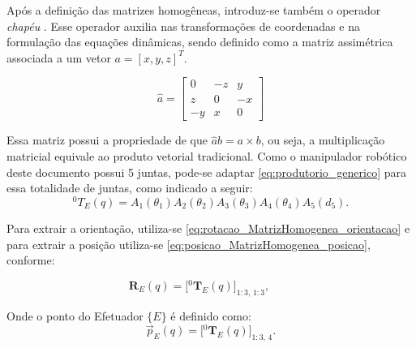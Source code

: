 Após a definição das matrizes homogêneas, introduz-se também o operador \emph{chapéu} \cite{murray1994mathematical}. Esse operador auxilia nas transformações de coordenadas e na formulação das equações dinâmicas, sendo definido como a matriz assimétrica associada a um vetor $a = [x, y, z]^T$.

\begin{equation}
    \label{eq:matriz_assimetrica}
    \hat{a} = 
    \begin{bmatrix}
        0   & -z  &  y \\
        z   &  0  & -x \\
        -y  &  x  &  0
    \end{bmatrix}
\end{equation}

Essa matriz possui a propriedade de que $\hat{a} b = a \times b$, ou seja, a multiplicação matricial equivale ao produto vetorial tradicional.
Como o manipulador robótico deste documento possui 5 juntas, pode-se adaptar \eqref{eq:produtorio_generico} para essa totalidade de juntas, como indicado a seguir:
\begin{equation}
{}^{0}\!T_E(q)=
A_1(\theta_1)
A_2(\theta_2)
A_3(\theta_3)
A_4(\theta_4)
A_5(d_5).
\end{equation}

Para extrair a orientação, utiliza-se \eqref{eq:rotacao_MatrizHomogenea_orientacao} e para extrair a posição utiliza-se \eqref{eq:posicao_MatrizHomogenea_posicao}, conforme:

\begin{equation}
    \label{eq:rotacao_MatrizHomogenea_orientacao}
\mathbf{R}_E(q) = \big[{}^{0}\mathbf{T}_E(q)\big]_{1:3,\,1:3},\qquad
\end{equation}

Onde o ponto do Efetuador $\{E\}$ é definido como:
\begin{equation}
    \label{eq:posicao_MatrizHomogenea_posicao}
\vec{p}_E(q) = \big[{}^{0}\mathbf{T}_E(q)\big]_{1:3,\,4}.
\end{equation}
